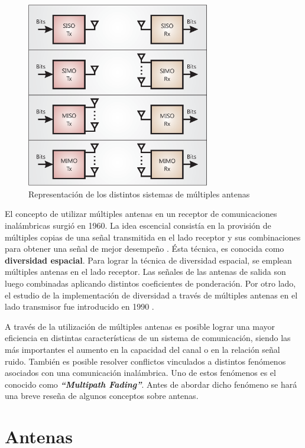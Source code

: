 \begin{figure}[htb!]
        \centering
        \includegraphics[width=8cm]{./figures/C02-MIMO_Combinations}
        \caption{Representación de los distintos sistemas de múltiples antenas}
        \label{fig:MIMO_Combinations}
\end{figure}

El concepto de utilizar múltiples antenas en un receptor de comunicaciones inalámbricas surgió en 1960. La idea escencial consistía en la provisión de múltiples copias de una señal transmitida en el lado receptor y sus combinaciones para obtener una señal de mejor desempeño \cite{Mohammadi}. Ésta técnica, es conocida como \textbf{diversidad espacial}. Para lograr la técnica de diversidad espacial, se emplean múltiples antenas en el lado receptor. Las señales de las antenas de salida son luego combinadas aplicando distintos coeficientes de ponderación. Por otro lado, el estudio de la implementación de diversidad a través de múltiples antenas en el lado transmisor fue introducido en 1990 \cite{Paulraj}. 

A través de la utilización de múltiples antenas es posible lograr una mayor eficiencia en distintas características de un sistema de comunicación, siendo las más importantes el aumento en la capacidad del canal o en la relación señal ruido. También es posible resolver conflictos vinculados a distintos fenómenos asociados con una comunicación inalámbrica. Uno de estos fenómenos es el conocido como \textbf{\textit{``Multipath Fading''}}. Antes de abordar dicho fenómeno se hará una breve reseña de algunos conceptos sobre antenas.

\section{Antenas}

